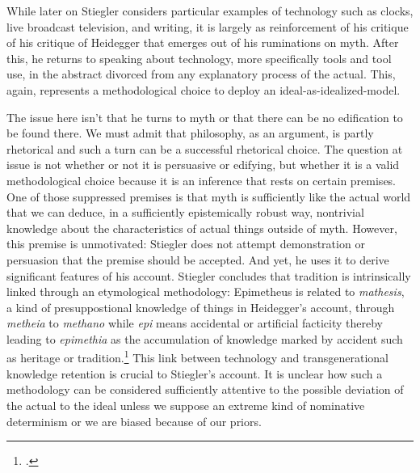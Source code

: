 \documentclass[letterpaper,notitlepage,12pt]{article}
\begin{document}
While later on Stiegler considers particular examples of technology such as
clocks, live broadcast television, and writing, it is largely as reinforcement
of his critique of his critique of Heidegger that emerges out of his ruminations
on myth.
After this, he returns to speaking about technology, more specifically tools and
tool use, in the abstract divorced from any explanatory process of the actual.
This, again, represents a methodological choice to deploy an
ideal-as-idealized-model.

The issue here isn't that he turns to myth or that there can be no edification
to be found there.
We must admit that philosophy, as an argument, is partly rhetorical and such a
turn can be a successful rhetorical choice.
The question at issue is not whether or not it is persuasive or edifying, but
whether it is a valid methodological choice because it is an inference that
rests on certain premises.
One of those suppressed premises is that myth is sufficiently like the actual
world that we can deduce, in a sufficiently epistemically robust way,
nontrivial knowledge about the characteristics of actual things outside of myth.
However, this premise is unmotivated: Stiegler does not attempt demonstration or
persuasion that the premise should be accepted.
And yet, he uses it to derive significant features of his account.
Stiegler concludes that tradition is intrinsically linked through an
etymological methodology: Epimetheus is related to \textit{mathesis}, a kind of
presuppostional knowledge of things in Heidegger's account, through
\textit{metheia} to \textit{methano} while \textit{epi} means accidental or
artificial facticity thereby leading to \textit{epimethia} as the accumulation
of knowledge marked by accident such as heritage or tradition.\footcite[p.
206--7]{stiegler_technics_1998}
This link between technology and transgenerational knowledge retention is
crucial to Stiegler's account.
It is unclear how such a methodology can be considered sufficiently attentive to
the possible deviation of the actual to the ideal unless we suppose an extreme
kind of nominative determinism or we are biased because of our priors.
\end{document}
